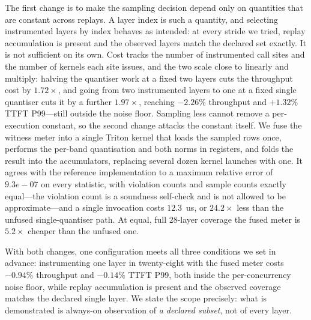 \documentclass[11pt]{article}
\begin{document}
The first change is to make the sampling decision depend only on quantities that are
constant across replays. A layer index is such a quantity, and selecting instrumented
layers by index behaves as intended: at every stride we tried, replay accumulation is
present and the observed layers match the declared set exactly. It is not sufficient
on its own. Cost tracks the number of instrumented call sites and the number of
kernels each site issues, and the two scale close to linearly and multiply: halving
the quantiser work at a fixed two layers cuts the throughput cost by $1.72\times$,
and going from two instrumented layers to one at a fixed single quantiser cuts it by a
further $1.97\times$, reaching $-2.26\%$ throughput and $+1.32\%$
TTFT P99---still outside the noise floor. Sampling less cannot remove a
per-execution constant, so the
second change attacks the constant itself. We fuse the witness meter into a single
Triton kernel that loads the sampled rows once, performs the per-band quantisation and
both norms in registers, and folds the result into the accumulators, replacing several
dozen kernel launches with one. It agrees with the reference implementation to a
maximum relative error of $9.3e-07$ on every statistic, with violation counts
and sample counts exactly equal---the violation count is a soundness self-check and is
not allowed to be approximate---and a single invocation costs $12.3$~us, or
$24.2\times$ less than the unfused single-quantiser path. At equal, full
$28$-layer coverage the fused meter is $5.2\times$ cheaper than the
unfused one.

With both changes, one configuration meets all three conditions we set in advance:
instrumenting one layer in twenty-eight with the fused meter costs $-0.94\%$
throughput and $-0.14\%$ TTFT P99, both inside the per-concurrency noise
floor, while replay accumulation is present and the observed coverage matches the
declared single layer. We state the scope precisely: what is
demonstrated is always-on observation of \emph{a declared subset}, not of
every layer.
\end{document}
